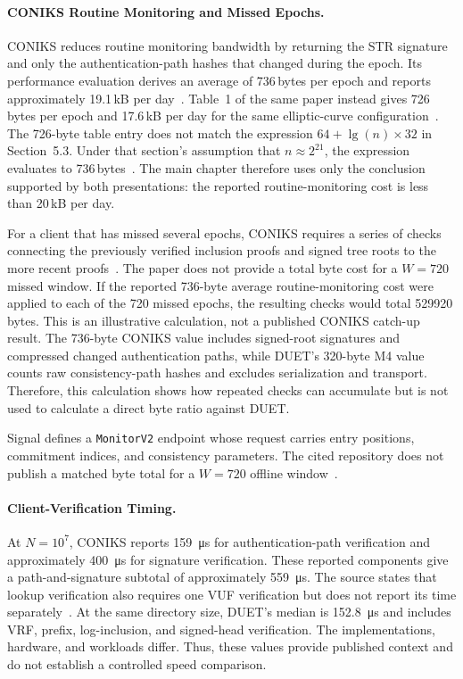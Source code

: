 \paragraph{CONIKS Routine Monitoring and Missed Epochs.}
CONIKS reduces routine monitoring bandwidth by returning the STR signature and only the
authentication-path hashes that changed during the epoch. Its performance evaluation derives
an average of \num{736}\,bytes per epoch and reports approximately \num{19.1}\,kB per
day~\cite[Section~5.3]{melara2015coniks}. Table~1 of the same paper instead gives
\num{726}\,bytes per epoch and \num{17.6}\,kB per day for the same elliptic-curve
configuration~\cite[Table~1]{melara2015coniks}. The \num{726}-byte table entry does not match the
expression $64+\lg(n)\times32$ in Section~5.3. Under that section's assumption that
$n\approx2^{21}$, the expression evaluates to
\num{736}\,bytes~\cite[Section~5.3]{melara2015coniks}. The main chapter therefore uses
only the conclusion supported by both presentations: the reported routine-monitoring cost is less
than 20\,kB per day.

For a client that has missed several epochs, CONIKS requires a series of checks connecting the
previously verified inclusion proofs and signed tree roots to the more recent
proofs~\cite{melara2015coniks}. The paper does not provide a total byte cost for a
$W=720$ missed window. If the reported \num{736}-byte average routine-monitoring cost were applied
to each of the \num{720} missed epochs, the resulting checks would total
\num{529920}\,bytes. This is an illustrative calculation, not a published CONIKS catch-up result.
The \num{736}-byte CONIKS value includes signed-root signatures and compressed changed
authentication paths, while DUET's
\num{320}-byte M4 value counts raw consistency-path hashes and excludes serialization and
transport. Therefore, this calculation shows how repeated checks can accumulate but is not used to
calculate a direct byte ratio against DUET.

Signal defines a \texttt{MonitorV2} endpoint whose request carries entry positions, commitment
indices, and consistency parameters. The cited repository does not publish a matched byte total for
a $W=720$ offline window~\cite{signal-kt-server}.

\paragraph{Client-Verification Timing.}
At $N=10^7$, CONIKS reports \SI{159}{\micro\second} for authentication-path verification and
approximately \SI{400}{\micro\second} for signature verification. These reported components give a
path-and-signature subtotal of approximately \SI{559}{\micro\second}. The source states that lookup
verification also requires one VUF verification but does not report its time
separately~\cite[Section~5.3]{melara2015coniks}. At the same directory size, DUET's median is
\SI{152.8}{\micro\second} and includes VRF, prefix, log-inclusion, and signed-head verification. The
implementations, hardware, and workloads differ. Thus, these values provide published context and do
not establish a controlled speed comparison.

